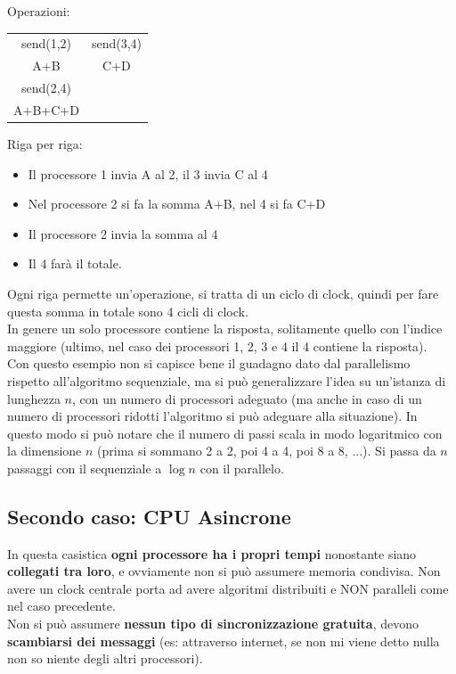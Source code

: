 \documentclass[11pt]{article}
\begin{document}
	Operazioni: 
	
	\begin{tabular}{c c}
		send(1,2) & send(3,4) \\
		A+B & C+D \\
		send(2,4) & \\
		A+B+C+D &
	\end{tabular}
	
	\newpage
	
	Riga per riga: 
	\begin{itemize}
		\item Il processore 1 invia A al 2, il 3 invia C al 4
		\item Nel processore 2 si fa la somma A+B, nel 4 si fa C+D
		\item Il processore 2 invia la somma al 4 
		\item Il 4 farà il totale.
	\end{itemize}
	
 	Ogni riga permette un'operazione, si tratta di un ciclo di clock, quindi per fare questa somma in totale sono 4 cicli di clock. \\

	In genere un solo processore contiene la risposta, solitamente quello con l'indice maggiore (ultimo, nel caso dei processori 1, 2, 3 e 4 il 4 contiene la risposta). \\

	Con questo esempio non si capisce bene il guadagno dato dal parallelismo rispetto all'algoritmo sequenziale, ma si può generalizzare l'idea su un'istanza di lunghezza $n$, con un numero di processori adeguato (ma anche in caso di un numero di processori ridotti l'algoritmo si può adeguare alla situazione). In questo modo si può notare che il numero di passi scala in modo logaritmico con la dimensione $n$ (prima si sommano 2 a 2, poi 4 a 4, poi 8 a 8, ...). Si passa da $n$ passaggi con il sequenziale a $\log n$ con il parallelo. \\
	
	\newpage
	
	\subsection*{Secondo caso: CPU Asincrone}
	In questa casistica \textbf{ogni processore ha i propri tempi} nonostante siano \textbf{collegati tra loro}, e ovviamente non si può assumere memoria condivisa. Non avere un clock centrale porta ad avere algoritmi distribuiti e NON paralleli come nel caso precedente.\\
	Non si può assumere \textbf{nessun tipo di sincronizzazione gratuita}, devono \textbf{scambiarsi dei messaggi} (es: attraverso internet, se non mi viene detto nulla non so niente degli altri processori).\\
	
\end{document}
